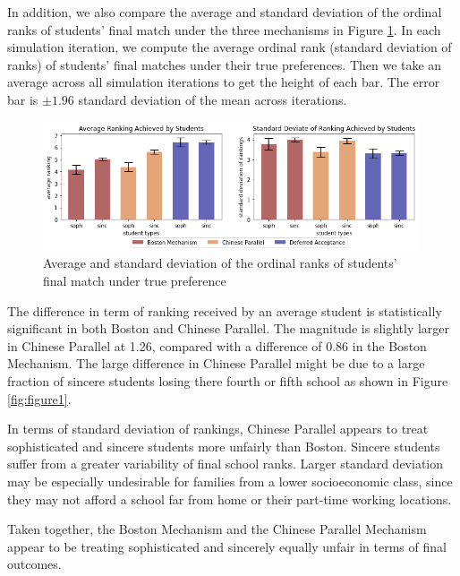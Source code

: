 \documentclass[10pt, reqno]{amsart}
\begin{document}
In addition, we also compare the average and standard deviation of the ordinal ranks of students' final match under the three mechanisms in Figure \ref{fig:figure2}. In each simulation iteration, we compute the average ordinal rank (standard deviation of ranks) of students' final matches under their true preferences. Then we take an average across all simulation iterations to get the height of each bar. The error bar is $\pm 1.96$ standard deviation of the mean across iterations. 
\begin{figure}[h]
  \centering
  \includegraphics[width=0.99\textwidth]{../figures/DABMCP_rank_ave_std_p2.png}
  \caption{Average and standard deviation of the ordinal ranks of students' final match under true preference}
  \label{fig:figure2}
\end{figure}
The difference in term of ranking received by an average student is statistically significant in both Boston and Chinese Parallel. The magnitude is slightly larger in Chinese Parallel at 1.26, compared with a difference of 0.86 in the Boston Mechanism. The large difference in Chinese Parallel might be due to a large fraction of sincere students losing there fourth or fifth school as shown in Figure \ref{fig:figure1}.

In terms of standard deviation of rankings, Chinese Parallel appears to treat sophisticated and sincere students more unfairly than Boston. Sincere students suffer from a greater variability of final school ranks. Larger standard deviation may be especially undesirable for families from a lower socioeconomic class, since they may not afford a school far from home or their part-time working locations. 

Taken together, the Boston Mechanism and the Chinese Parallel Mechanism appear to be treating sophisticated and sincerely equally unfair in terms of final outcomes. 


\end{document}
